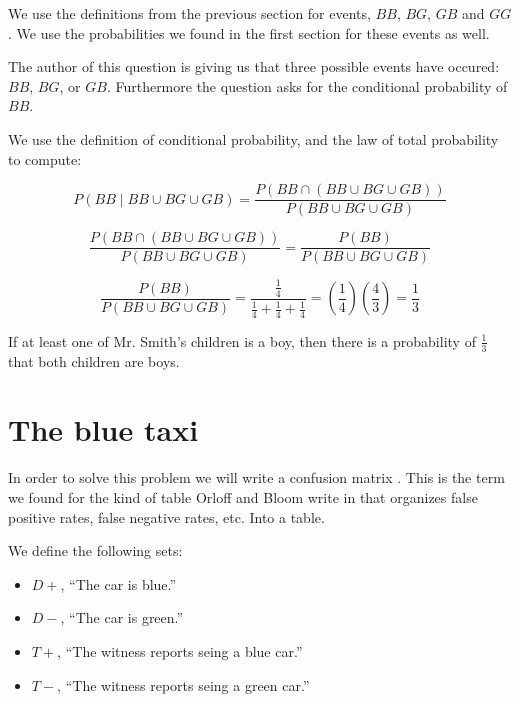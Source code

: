 \documentclass[a4paper,11pt]{article}
\begin{document}
We use the definitions from the previous section for events, $BB$, $BG$,
$GB$ and $GG$. We use the probabilities we found in the first section
for these events as well.

The  author of this question is giving us that three possible events
have occured: $BB$, $BG$, or $GB$.  Furthermore the question asks
for the conditional probability of $BB$.

We use the definition of conditional probability, and the law of total
probability to compute:

\begin{equation}
P \left( BB \mid BB \cup BG \cup GB \right) 
= \frac{ P \left( BB \cap \left( BB \cup BG \cup GB \right) \right) }
  { P \left( BB \cup BG \cup GB \right) }
\end{equation}

\begin{equation}
\frac{ P \left( BB \cap \left( BB \cup BG \cup GB \right) \right) }
  { P \left( BB \cup BG \cup GB \right) }
= \frac{ P \left( BB \right)}
  { P \left( BB \cup BG \cup GB \right) }
\end{equation}

\begin{equation}
 \frac{ P \left( BB \right)}
  { P \left( BB \cup BG \cup GB \right) }
= \frac{ \frac{ 1}{4} }
  { \frac{1}{4} + \frac{1}{4} + \frac{1}{4}}
= \left( \frac{1}{4} \right) \left( \frac{4}{3} \right)
= \frac{1}{3}
\end{equation}

If at least one of Mr. Smith's children is a boy, then there is a 
probability of $\frac{1}{3}$ that both children are boys.

\section{The blue taxi}

In order to solve this problem we will write a confusion matrix
\cite{confusionMatrix}.  This is the term we found for the kind of 
table Orloff and Bloom write in \cite{reading3} that organizes false
positive rates, false negative rates, etc. Into a table.

We define the following sets:
  \begin{itemize}
  \item $D+$, ``The car is blue.''
  \item $D-$, ``The car is green.''
  \item $T+$, ``The witness reports seing a blue car.''
  \item $T-$, ``The witness reports seing a green car.''
\end{itemize}
\end{document}
